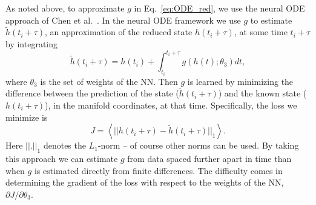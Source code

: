 \documentclass[preprint,aps,pre,letterpaper,onecolumn,superscriptaddress]{revtex4-2} %
\begin{document}


As noted above, to approximate $g$ in Eq.\ \ref{eq:ODE_red}, we use the neural ODE approach of Chen et al.\ \cite{Chen2019}.  %
In the neural ODE framework we use $g$ to estimate $\tilde{h}(t_i+\tau)$, an approximation of the reduced state $h(t_i+\tau)$, at some time $t_i+\tau$ by integrating 
\begin{equation}\label{eq:ODENet_Int}
	\tilde{h}(t_i+\tau)=h(t_i)+\int_{t_i}^{t_i+\tau}g(h(t);\theta_3) dt,
\end{equation}
where $\theta_3$ is the set of weights of the NN. Then $g$ is learned by minimizing the difference between the prediction of the state ($\tilde{h}(t_i+\tau)$) and the known state ($h(t_i+\tau)$), in the manifold coordinates, at that time. Specifically, the loss we minimize is
\begin{equation}\label{eq:ODENet}
	J=\left<||h(t_i+\tau)-\tilde{h}(t_i+\tau)||_1\right>.
\end{equation}
Here $||.||_1$ denotes the $L_1$-norm -- of course other norms can be used.
By taking this approach we can estimate $g$ from data spaced further apart in time than when $g$ is estimated directly from finite differences.
%
%	
%
 The difficulty comes in determining the gradient of the loss with respect to the weights of the NN, $\partial J/\partial \theta_3$. 
\end{document}
